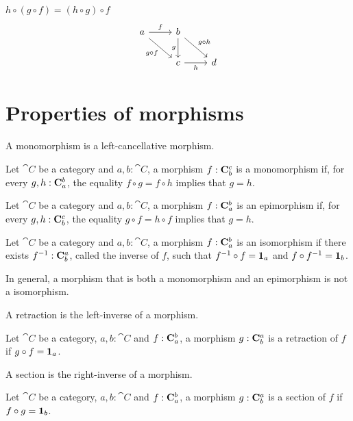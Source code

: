\documentclass[12pt]{article}
\begin{document}
\begin{definition}
\begin{itemize}
\begin{itemize}
                \(h \circ (g \circ f) = (h \circ g) \circ f\)
                \begin{equation*}
                    \begin{tikzcd}
                        a   \arrow[r,"f"]
                            \arrow[dr, swap,"g \circ f"]& 
                        b   \arrow[dr,"g \circ h"] 
                            \arrow[d,swap,"g"]\\
                        {} & 
                        c \arrow[r,swap,"h"] & 
                        d
                    \end{tikzcd}
                \end{equation*}
                
            \end{itemize}
    \end{itemize}
\end{definition}

\section{Properties of morphisms}

A monomorphism is a left-cancellative morphism.
\begin{definition}
    Let \(\cat{C}\) be a category and \(a,b:\cat{C}\), a morphism \(f : \morphs{C} {b} {c}\) is a monomorphism
    if, for every \(g, h : \morphs{C}{a}{b}\), the equality \(f \circ g = f \circ h\) implies that \(g=h\). 
\end{definition}

\begin{definition}
    Let \(\cat{C}\) be a category and \(a,b:\cat{C}\), a morphism \(f : \morphs{C} {a} {b}\) is an epimorphism
    if, for every \(g, h : \morphs{C}{b}{c}\), the equality \(g \circ f = h \circ f \) implies that \(g=h\). 
\end{definition}

\begin{definition}
    Let \(\cat{C}\) be a category and \(a,b:\cat{C}\), a morphism \(f : \morphs{C} {a} {b}\) is an isomorphism if there exists \(f^{-1} : \morphs{C}{b}{a}\), called the inverse of \(f\), such that \(f^{-1} \circ f = \idarrow[a]\) and 
    \(f \circ f^{-1} = \idarrow[b]\).
\end{definition}

In general, a morphism that is both a monomorphism and an epimorphism is not a isomorphism.

A retraction is the left-inverse of a morphism.
\begin{definition}
    Let \(\cat{C}\) be a category, \(a,b:\cat{C}\) and \(f : \morphs{C}{a}{b}\),
    a morphism \( g : \morphs{C}{b}{a}\) is a retraction of \(f\) if 
    \(g \circ f = \idarrow[a]\).
\end{definition}
A section is the right-inverse of a morphism.
\begin{definition}
    Let \(\cat{C}\) be a category, \(a,b:\cat{C}\) and \(f : \morphs{C} {a} {b}\),
    a morphism \( g : \morphs{C}{b}{a}\) is a section of \(f\) if 
    \(f \circ g = \idarrow[b]\).
\end{definition}
\end{document}
